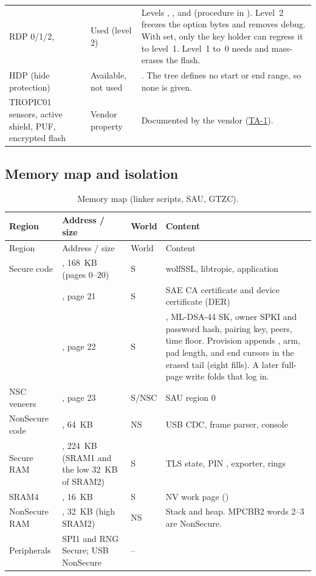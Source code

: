 \documentclass[11pt,a4paper]{article}
\begin{document}
\begin{longtable}{L{4.2cm}L{2.8cm}L{8.6cm}}
RDP 0/1/2,  & Used (level 2) & Levels , , and  (procedure in ). Level~2 freezes the option bytes and removes debug. With  set, only the key holder can regress it to level~1. Level~1 to~0 needs  and mass-erases the flash.\\
HDP (hide protection) & Available, not used & . The tree defines no start or end range, so none is given.\\
TROPIC01 sensors, active shield, PUF, encrypted flash & Vendor property & Documented by the vendor (\hyperref[ta:TA-1]{TA-1}).\\
\bottomrule
\end{longtable}

\subsection{Memory map and isolation}
\begin{longtable}{L{3.0cm}L{4.4cm}L{1.4cm}L{6.8cm}}
\caption{Memory map (linker scripts, SAU, GTZC).}\label{tab:map}\\
\toprule Region & Address / size & World & Content\\ \midrule\endfirsthead
\toprule Region & Address / size & World & Content\\ \midrule\endhead
Secure code & , 168~KB (pages 0--20) & S & wolfSSL, libtropic, application\\
 & , page 21 & S & SAE CA certificate and device certificate (DER)\\
 & , page 22 & S & , ML-DSA-44 SK, owner SPKI and password hash, pairing key, peers, time floor. Provision appends , arm, pad length, and end cursors in the erased tail (eight fills). A later full-page write folds that log in.\\
NSC veneers & , page 23 & S/NSC & SAU region 0\\
NonSecure code & , 64~KB & NS & USB CDC, frame parser, console\\
Secure RAM & , 224~KB (SRAM1 and the low 32~KB of SRAM2) & S & TLS state, PIN , exporter, rings\\
SRAM4 & , 16~KB & S & NV work page ()\\
NonSecure RAM & , 32~KB (high SRAM2) & NS & Stack and heap. MPCBB2 words 2--3 are NonSecure.\\
Peripherals & SPI1 and RNG Secure; USB NonSecure & -- & \\
\bottomrule
\end{longtable}
\end{document}
